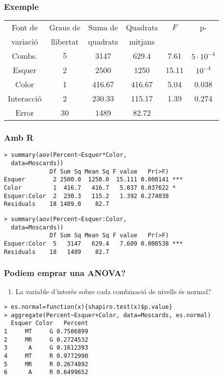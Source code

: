 \documentclass[12pt,t]{beamer}
\theoremstyle{plain}
\theoremstyle{definition}
\begin{document}
\begin{frame}
\frametitle{Exemple}

\begin{center}\small
\begin{tabular}{cccccc}
\hline
 Font de& Graus de& Suma de& Quadrats& $F$ & p- \\
variació&llibertat&quadrats&mitjans& &\\\hline
Combs.&$5$& 3147&629.4& 7.61 & $5\cdot 10^{-4}$ \\[1ex]
Esquer &2& 2500 &1250& 15.11&  $10^{-4}$ \\[1ex]
Color &1&416.67&416.67& 5.04&  0.038\\[1ex]
Interacció & 2 &230.33&115.17& 1.39 &  0.274\\[1ex]
Error&30&1489&82.72 && \\\hline
\end{tabular}
\end{center}

\end{frame}


\begin{frame}[fragile]
\frametitle{Amb R}

 \begin{lstlisting}
> summary(aov(Percent~Esquer*Color, 
  data=Moscards))
             Df Sum Sq Mean Sq F value   Pr(>F)    
Esquer        2 2500.0  1250.0  15.111 0.000141 ***
Color         1  416.7   416.7   5.037 0.037622 *  
Esquer:Color  2  230.3   115.2   1.392 0.274038    
Residuals    18 1489.0    82.7                     
\end{lstlisting}\pause

\begin{lstlisting}
> summary(aov(Percent~Esquer:Color, 
  data=Moscards))
             Df Sum Sq Mean Sq F value   Pr(>F)    
Esquer:Color  5   3147   629.4   7.609 0.000538 ***
Residuals    18   1489    82.7   
\end{lstlisting}

\end{frame}



\begin{frame}[fragile]
\frametitle{Podíem emprar una ANOVA?}\vspace*{-2ex}

\begin{enumerate}
\item La variable d'interès sobre cada combinació de nivells és normal?
\end{enumerate}

\begin{lstlisting}
> es.normal=function(x){shapiro.test(x)$p.value}
> aggregate(Percent~Esquer+Color, data=Moscards, es.normal)
  Esquer Color   Percent
1     MT     G 0.7506899
2     MR     G 0.2724532
3      A     G 0.1612393
4     MT     R 0.9772990
5     MR     R 0.2674892
6      A     R 0.6499652
\end{lstlisting}

\end{frame}
\end{document}
